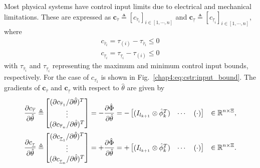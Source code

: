 Most physical systems have control input limits due to electrical and mechanical limitations. These are expressed as $\mathbf{c}_{\overline \tau}\triangleq [c_{\overline \tau_i}]_{i\in[1,\cdots,n]}$ and $\mathbf{c}_{\underline\tau}\triangleq [c_{\underline\tau_i}]_{i\in[1,\cdots,n]}$, where
\begin{equation}
    \begin{aligned}
        c_{\overline \tau_i}=\tau_{(i)} - {\tau_{\overline \tau_i}} \le 0
        \\
        c_{\underline\tau_i}={\tau_{\underline\tau_i}}-\tau_{(i)} \le 0
    \end{aligned}
    \label{chap4:eq:cstr:input_bound}
\end{equation}
with $\tau_{\overline \tau_i}$ and $\tau_{\underline\tau_i}$ representing the maximum and minimum control input bounds, respectively.
For the case of $c_{\overline{\tau_1}}$ is shown in Fig.~\ref{chap4:eq:cstr:input_bound}.
The gradients of $\mathbf{c}_{\overline \tau}$ and $\mathbf{c}_{\underline\tau}$ with respect to $\hat\theta$ are given by
\begin{equation}
    \begin{aligned}
        {\partial \mathbf \mathbf c_{\overline \tau} \over \partial \hat\theta}
        \triangleq
        & 
        \begin{bmatrix}
            (\partial c_{\overline \tau_1}/\partial \hat\theta)^T \\
            \vdots \\
            (\partial c_{\overline \tau_n}/\partial \hat\theta)^T
        \end{bmatrix}
         = -{\partial \hat\Phi\over\partial\hat\theta}
        =
        -\begin{bmatrix}
            (I_{l_{k+1}}\otimes \hat\phi_{k}^T)&
            \cdots &
            (
            \cdot
            )
        \end{bmatrix} 
        &
        \in
        \mathbb{R}^{n\times \Xi}
        , 
        \\
        {\partial \mathbf \mathbf c_{\underline\tau} \over \partial \hat\theta}         
        \triangleq
        & 
        \begin{bmatrix}
            (\partial c_{\underline\tau_1}/\partial \hat\theta)^T \\
            \vdots \\
            (\partial c_{\underline\tau_n}/\partial \hat\theta)^T
        \end{bmatrix}
        = +{\partial \hat\Phi\over\partial\hat\theta}
        =
        +\begin{bmatrix}
            (I_{l_{k+1}}\otimes \hat\phi_{k}^T)&
            \cdots &
            (
            \cdot
            )
        \end{bmatrix} 
        &
        \in
        \mathbb{R}^{n\times \Xi}
        .
    \end{aligned}
    \label{chap4:eq:cstr:input_bound_grad}
\end{equation}

